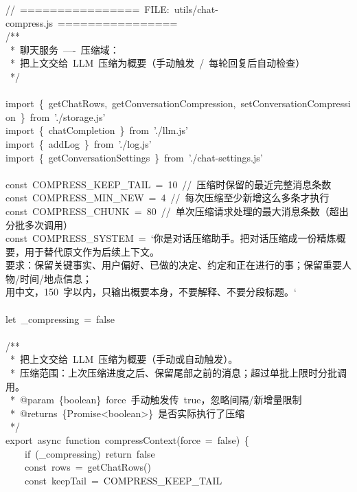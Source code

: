 \documentclass[a4paper,10pt]{article}
\begin{document}
{\ttfamily\footnotesize\raggedright
//~================~FILE:~utils/chat-compress.js~================\\
/**\\
~*~聊天服务~----~压缩域：\\
~*~把上文交给~LLM~压缩为概要（手动触发~/~每轮回复后自动检查）\\
~*/\\
\mbox{}\\
import~\{~getChatRows,~getConversationCompression,~setConversationCompression~\}~from~'./storage.js'\\
import~\{~chatCompletion~\}~from~'./llm.js'\\
import~\{~addLog~\}~from~'./log.js'\\
import~\{~getConversationSettings~\}~from~'./chat-settings.js'\\
\mbox{}\\
const~COMPRESS\_KEEP\_TAIL~=~10~//~压缩时保留的最近完整消息条数\\
const~COMPRESS\_MIN\_NEW~=~4~//~每次压缩至少新增这么多条才执行\\
const~COMPRESS\_CHUNK~=~80~//~单次压缩请求处理的最大消息条数（超出分批多次调用）\\
const~COMPRESS\_SYSTEM~=~`你是对话压缩助手。把对话压缩成一份精炼概要，用于替代原文作为后续上下文。\\
要求：保留关键事实、用户偏好、已做的决定、约定和正在进行的事；保留重要人物/时间/地点信息；\\
用中文，150~字以内，只输出概要本身，不要解释、不要分段标题。`\\
\mbox{}\\
let~\_compressing~=~false\\
\mbox{}\\
/**\\
~*~把上文交给~LLM~压缩为概要（手动或自动触发）。\\
~*~压缩范围：上次压缩进度之后、保留尾部之前的消息；超过单批上限时分批调用。\\
~*~@param~\{boolean\}~force~手动触发传~true，忽略间隔/新增量限制\\
~*~@returns~\{Promise<boolean>\}~是否实际执行了压缩\\
~*/\\
export~async~function~compressContext(force~=~false)~\{\\
~~~~if~(\_compressing)~return~false\\
~~~~const~rows~=~getChatRows()\\
~~~~const~keepTail~=~COMPRESS\_KEEP\_TAIL\\
}
\end{document}
